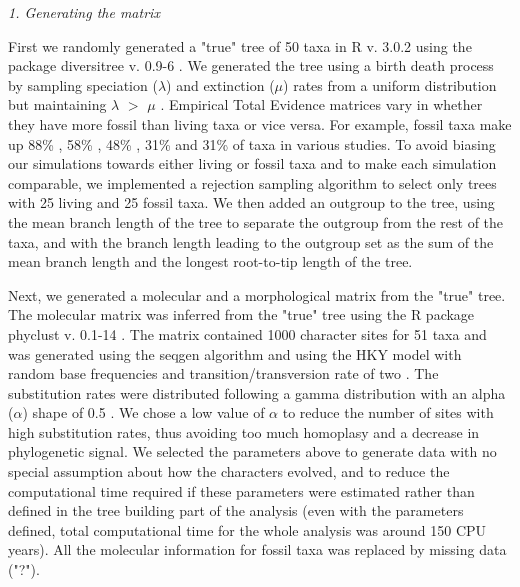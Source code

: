 \documentclass[12pt,letterpaper]{article}
\renewcommand{\subsection}[1]{%
\bigskip
\begin{center}
\begin{large}
\normalfont\itshape #1
\end{large}
\end{center}}
\begin{document}

\subsection{1. Generating the matrix}
\label{Generating_the_matrix}
First we randomly generated a "true" tree of 50 taxa in R v. 3.0.2 \citep{R302} using the package diversitree v. 0.9-6 \citep{fitzjohndiversitree2012}. We generated the tree using a birth death process by sampling speciation ($\lambda$) and extinction ($\mu$) rates from a uniform distribution but maintaining $\lambda$ $>$ $\mu$ \citep{paradistime-dependent2011}. Empirical Total Evidence matrices vary in whether they have more fossil than living taxa or vice versa. For example, fossil taxa make up 88\% \citealt{beckancient2014}, 58\% \citealt{schragocombining2013}, 48\% \citealt{pyrondivergence2011}, 31\% \citealt{ronquista2012} and 31\% \citealt{slaterphylogenetic2013} of taxa in various studies. To avoid biasing our simulations towards either living or fossil taxa and to make each simulation comparable, we implemented a rejection sampling algorithm to select only trees with 25 living and 25 fossil taxa. We then added an outgroup to the tree, using the mean branch length of the tree to separate the outgroup from the rest of the taxa, and with the branch length leading to the outgroup set as the sum of the mean branch length and the longest root-to-tip length of the tree.

Next, we generated a molecular and a morphological matrix from the "true" tree. The molecular matrix was inferred from the "true" tree using the R package phyclust v. 0.1-14 \citep{chen2011}. The matrix contained 1000 character sites for 51 taxa and was generated using the seqgen algorithm \citep{ranbaut1997seqgen} and using the HKY model \citep{HKY85} with random base frequencies and transition/transversion rate of two \citep{douadycomparison2003}. The substitution rates were distributed following a gamma distribution with an alpha ($\alpha$) shape of 0.5 \citep{yangamong-site1996}. We chose a low value of $\alpha$ to reduce the number of sites with high substitution rates, thus avoiding too much homoplasy and a decrease in phylogenetic signal. We selected the parameters above to generate data with no special assumption about how the characters evolved, and to reduce the computational time required if these parameters were estimated rather than defined in the tree building part of the analysis (even with the parameters defined, total computational time for the whole analysis was around 150 CPU years). All the molecular information for fossil taxa was replaced by missing data ("?").
\end{document}
